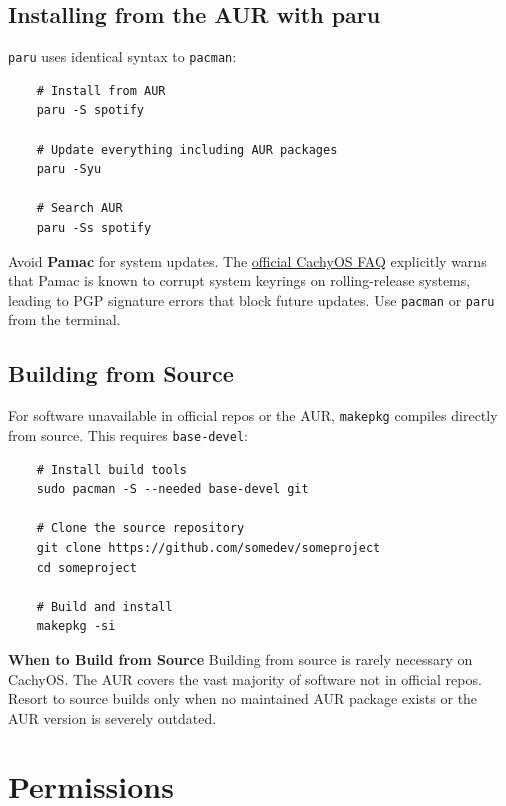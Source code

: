\documentclass{article}
\newcommand{\code}[1]{\colorbox{codebg}{\texttt{#1}}}
\begin{document}
\subsection{Installing from the AUR with paru}

\code{paru} uses identical syntax to \code{pacman}:

\begin{verbatim}
	# Install from AUR
	paru -S spotify
	
	# Update everything including AUR packages
	paru -Syu
	
	# Search AUR
	paru -Ss spotify
\end{verbatim}

\begin{tcolorbox}[arc=12pt, outer arc=10pt,
	colback=red!5!white, colframe=red!60!black,
	title=\textbf{Warning}]
	Avoid \textbf{Pamac} for system updates. The
	\href{https://wiki.cachyos.org/cachyos_basic/faq/}{official CachyOS FAQ}
	explicitly warns that Pamac is known to corrupt system keyrings on rolling-release
	systems, leading to PGP signature errors that block future updates. Use
	\code{pacman} or \code{paru} from the terminal.
\end{tcolorbox}

\subsection{Building from Source}

For software unavailable in official repos or the AUR, \code{makepkg} compiles
directly from source. This requires \code{base-devel}:

\begin{verbatim}
	# Install build tools
	sudo pacman -S --needed base-devel git
	
	# Clone the source repository
	git clone https://github.com/somedev/someproject
	cd someproject
	
	# Build and install
	makepkg -si
\end{verbatim}

\begin{callout}{\textbf{When to Build from Source}}
	Building from source is rarely necessary on CachyOS. The AUR covers the vast
	majority of software not in official repos. Resort to source builds only when no
	maintained AUR package exists or the AUR version is severely outdated.
\end{callout}

\newpage
\section{Permissions}
\end{document}
